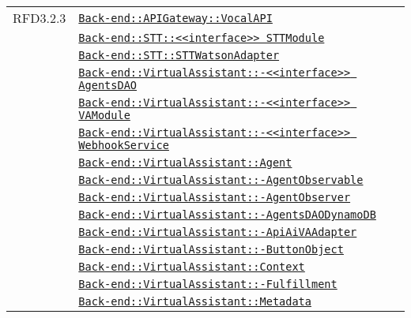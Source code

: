\begin{longtable}{|>{\centering}m{3cm}|m{10cm}<{\centering}|}
RFD3.2.3 & \hyperref[Back-end::APIGateway::VocalAPI]{\texttt{Back-end::APIGateway::VocalAPI}}\\
& \hyperref[Back-end::STT::<<interface>> STTModule]{\texttt{Back-end::STT::<<interface>> STTModule}}\\
& \hyperref[Back-end::STT::STTWatsonAdapter]{\texttt{Back-end::STT::STTWatsonAdapter}}\\
& \hyperref[Back-end::VirtualAssistant::<<interface>> AgentsDAO]{\texttt{Back-end::VirtualAssistant::-\linebreak <<interface>> AgentsDAO}}\\
& \hyperref[Back-end::VirtualAssistant::<<interface>> VAModule]{\texttt{Back-end::VirtualAssistant::-\linebreak <<interface>> VAModule}}\\
& \hyperref[Back-end::VirtualAssistant::<<interface>> WebhookService]{\texttt{Back-end::VirtualAssistant::-\linebreak <<interface>> WebhookService}}\\
& \hyperref[Back-end::VirtualAssistant::Agent]{\texttt{Back-end::VirtualAssistant::Agent}}\\
& \hyperref[Back-end::VirtualAssistant::AgentObservable]{\texttt{Back-end::VirtualAssistant::-\linebreak AgentObservable}}\\
& \hyperref[Back-end::VirtualAssistant::AgentObserver]{\texttt{Back-end::VirtualAssistant::-\linebreak AgentObserver}}\\
& \hyperref[Back-end::VirtualAssistant::AgentsDAODynamoDB]{\texttt{Back-end::VirtualAssistant::-\linebreak AgentsDAODynamoDB}}\\
& \hyperref[Back-end::VirtualAssistant::ApiAiVAAdapter]{\texttt{Back-end::VirtualAssistant::-\linebreak ApiAiVAAdapter}}\\
& \hyperref[Back-end::VirtualAssistant::ButtonObject]{\texttt{Back-end::VirtualAssistant::-\linebreak ButtonObject}}\\
& \hyperref[Back-end::VirtualAssistant::Context]{\texttt{Back-end::VirtualAssistant::Context}}\\
& \hyperref[Back-end::VirtualAssistant::Fulfillment]{\texttt{Back-end::VirtualAssistant::-\linebreak Fulfillment}}\\
& \hyperref[Back-end::VirtualAssistant::Metadata]{\texttt{Back-end::VirtualAssistant::Metadata}}\\

\end{longtable}
